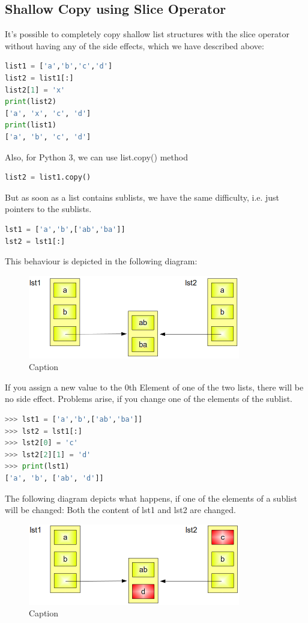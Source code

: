 \documentclass[../main.tex]{subfiles}
\begin{document}
\subsection{Shallow Copy using Slice Operator}
It's possible to completely copy shallow list structures with the slice operator without having any of the side effects, which we have described above:
\begin{lstlisting}[language = Python]
list1 = ['a','b','c','d']
list2 = list1[:]
list2[1] = 'x'
print(list2)
['a', 'x', 'c', 'd']
print(list1)
['a', 'b', 'c', 'd']
\end{lstlisting}
Also, for Python 3, we can use list.copy() method
\begin{lstlisting}[language = Python]
list2 = list1.copy()
\end{lstlisting}

But as soon as a list contains sublists, we have the same difficulty, i.e. just pointers to the sublists.
\begin{lstlisting}[language = Python]
lst1 = ['a','b',['ab','ba']]
lst2 = lst1[:]
\end{lstlisting}

This behaviour is depicted in the following diagram: 
\begin{figure}[h]
    \centering
    \includegraphics{fig/deep_copy_3.png}
    \caption{Caption}
    \label{fig:copy_3}
\end{figure}

If you assign a new value to the 0th Element of one of the two lists, there will be no side effect. Problems arise, if you change one of the elements of the sublist.
\begin{lstlisting}[language = Python]
>>> lst1 = ['a','b',['ab','ba']]
>>> lst2 = lst1[:]
>>> lst2[0] = 'c'
>>> lst2[2][1] = 'd'
>>> print(lst1)
['a', 'b', ['ab', 'd']]
\end{lstlisting}


The following diagram depicts what happens, if one of the elements of a sublist will be changed: Both the content of lst1 and lst2 are changed.
\begin{figure}[h]
    \centering
    \includegraphics{fig/deep_copy_4.png}
    \caption{Caption}
    \label{fig:copy_4}
\end{figure}
\end{document}

